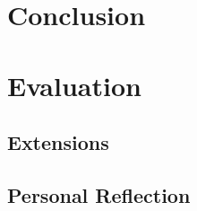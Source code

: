 \section{Conclusion}

\section{Evaluation}

\subsection{Extensions}

\subsection{Personal Reflection}
